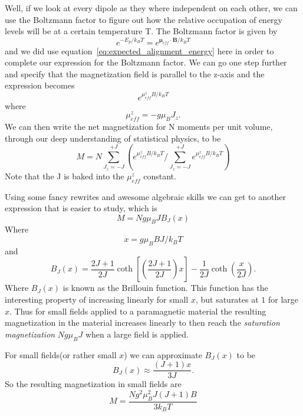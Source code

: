 \documentclass[11pt]{article}
\begin{document}
Well, if we look at every dipole as they where independent on each other, we can use the Boltzmann factor to figure out how the relative occupation of energy levels will be at a certain temperature T. The Boltzmann factor is given by
\begin{equation}
	e^{-E_p/k_B T} = e^{\pmb{\mu}_{eff} \cdot \pmb{B} / k_B T}
\end{equation}
and we did use equation~\ref{eq:expected_alignment_energy} here in order to complete our expression for the Boltzmann factor. We can go one step further and specify that the magnetization field is parallel to the z-axis and the expression becomes
\begin{equation}
	e^{\mu_{eff}^z B/k_B T}
\end{equation}
where 
\begin{equation}
	\mu_{eff}^z = -g\mu_B J_z.
\end{equation}
We can then write the net magnetization for N moments per unit volume, through our deep understanding of statistical physics, to be
\begin{equation}
	M = N \sum^{+J}_{J_z = -J} (e^{\mu_{eff}^z B/k_B T} / \sum^{+J}_{J_z = -J} e^{\mu_{eff}^z B/k_B T})
\end{equation}
Note that the J is baked into the $\mu_{eff}^z$ constant.

\newpage
Using some fancy rewrites and awesome algebraic skills we can get to another expression that is easier to study, which is
\begin{equation}
	M = Ng\mu_B J B_J(x)
\end{equation}
Where 
\begin{equation}
	x = g \mu_B BJ/k_B T
\end{equation}
and 
\begin{equation}
	B_J(x) = \frac{2J+1}{2J} \coth{[(\frac{2J+1}{2J})x]} - \frac{1}{2J}\coth{(\frac{x}{2J})}.
\end{equation}
Where $B_J(x)$ is known as the Brillouin function. This function has the interesting property of increasing linearly for small $x$, but saturates at $1$ for large $x$. Thus for small fields applied to a paramagnetic material the resulting magnetization in the material increases linearly to then reach the \emph{saturation magnetization} $Ng\mu_B J$ when a large field is applied. 

For small fields(or rather small $x$) we can approximate $B_J(x)$ to be
\begin{equation}
	B_J(x) \approx \frac{(J+1)x}{3J}.
\end{equation}
So the resulting magnetization in small fields are
\begin{equation}
	M = \frac{N g^2 \mu_B^2 J(J+1)B}{3k_B T}
\end{equation}
\end{document}
